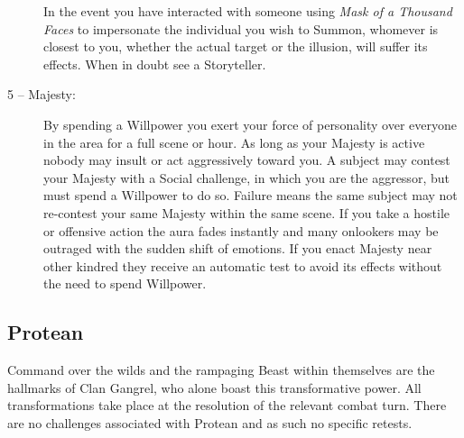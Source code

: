 \begin{description}
	In the event you have interacted with someone using \emph{Mask of a Thousand Faces} to impersonate the individual 
	you wish to Summon, whomever is closest to you, whether the actual target or the illusion, will suffer its 
	effects.  When in doubt see a Storyteller.
	\item[5 -- Majesty:]  By spending a Willpower you exert your force of personality over everyone in the area 
	for a full scene or hour.  As long as your Majesty is active nobody may insult or act aggressively toward 
	you.  A subject may contest your Majesty with a Social challenge, in which you are the aggressor, but must 
	spend a Willpower to do so.  Failure means the same subject may not re-contest your same Majesty within the 
	same scene.  If you take a hostile or offensive action the aura fades instantly and many onlookers may be 
	outraged with the sudden shift of emotions.  If you enact Majesty near other kindred they receive an 
	automatic test to avoid its effects without the need to spend Willpower.
\end{description}

\subsection{Protean}
Command over the wilds and the rampaging Beast within themselves are the hallmarks of Clan Gangrel, who alone 
boast this transformative power.  All transformations take place at the resolution of the relevant combat turn.  
There are no challenges associated with Protean and as such no specific retests.

